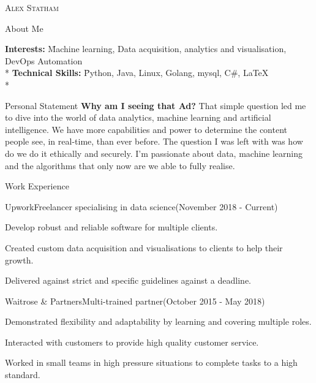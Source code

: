 \documentclass[a4paper]{article}
\newlength{\tabin}
\newlength{\secsep}
\newcommand{\lineunder}{\vspace*{-8pt} \\ \hspace*{-6pt} \hrulefill \\ \vspace*{-15pt}}
\newcommand{\name}[1]{\begin{center}\textsc{\Huge#1}\\\end{center}}
\newcommand{\contact}[1]{\begin{center}\color{contactgray}{\small#1}\end{center}}
\newenvironment{tabbedsection}[1]{
  \begin{list}{}{
      \setlength{\itemsep}{0pt}
      \setlength{\labelsep}{0pt}
      \setlength{\labelwidth}{0pt}
      \setlength{\leftmargin}{\tabin}
      \setlength{\rightmargin}{\tabin}
      \setlength{\listparindent}{0pt}
      \setlength{\parsep}{0pt}
      \setlength{\parskip}{0pt}
      \setlength{\partopsep}{0pt}
      \setlength{\topsep}{#1}
    }
  \item[]
}{\end{list}}
\newenvironment{nospacetabbing}{
    \begin{tabbing}
}{\end{tabbing}\vspace{-1.2em}}
\newenvironment{resume_header}{}{\vspace{0pt}}
\newenvironment{resume_section}[1]{
  \filbreak
  \vspace{2\secsep}
  \textsc{\large#1}
  \lineunder
  \begin{tabbedsection}{\secsep}
}{\end{tabbedsection}}
\newenvironment{subitems}{
  \renewcommand{\labelitemi}{-}
  \begin{itemize}
      \setlength{\labelsep}{1em}
}{\end{itemize}}
\newenvironment{resume_employer}[4]{
  \vspace{\secsep}
  \textbf{#1} \\ 
  \indent {\small #2} \hfill {\footnotesize#3 (#4)}
  \begin{tabbedsection}{0pt}
  \begin{subitems}
}{\end{subitems}\end{tabbedsection}}
\begin{document}
\begin{resume_header}
\name{Alex Statham}
\contact{alex.staham1998@gmail.com  $\bullet$ +447490973388 }
\end{resume_header}

\begin{resume_section}{About Me}
  \begin{nospacetabbing}
  \textbf{Interests:}  \= Machine learning,  Data acquisition, analytics and visualisation, DevOps Automation \\*
  \textbf{Technical Skills:}  \= Python, Java, Linux, Golang, mysql, C\#,  \LaTeX\\*
  \end{nospacetabbing}
\end{resume_section}

\begin{resume_section}{Personal Statement}
  \textbf{Why am I seeing that Ad?} That simple question led  me to dive into the world of data analytics, machine learning and  artificial intelligence. We have more capabilities and power to determine the content people see, in real-time, than ever before. The question I was left with was how do we do it ethically and securely. I'm passionate about data, machine learning and the algorithms that only now are we able to fully realise.
\end{resume_section}

\begin{resume_section}{Work Experience}
  \begin{resume_employer}{Upwork}{Freelancer specialising in data science}{}{(November 2018 - Current)}
    \item Develop robust and reliable software for multiple clients.
    \item Created custom data acquisition and  visualisations to clients to help their growth.
    \item Delivered against strict and specific guidelines against a deadline.
  \end{resume_employer}
  
  \begin{resume_employer}{Waitrose \& Partners}{Multi-trained partner}{}{(October 2015 - May 2018)}
    \item Demonstrated flexibility and adaptability by learning and covering multiple roles.
    \item Interacted with customers to provide high quality customer service.
    \item Worked in small teams in high pressure situations to complete tasks to a high standard.
  \end{resume_employer}
\end{resume_section}
\end{document}
